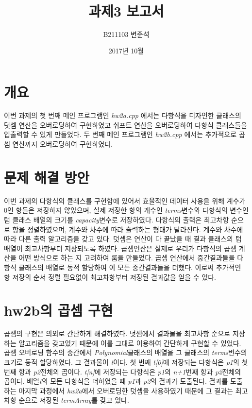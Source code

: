 \documentclass[a4paper,12pt]{article}
\begin{document}
 

\title{과제3 보고서}
\author{B211103 변준석}
\date{2017년 10월}
\maketitle

\newpage
\section{개요}
이번 과제의 첫 번째 메인 프로그램인 \textsl{hw2a.cpp} 에서는 다항식을 디자인한 클래스의 덧셈 연산을 오버로딩하여 구현하였고 쉬프트 연산을 오버로딩하여 다항식 클래스들을 입출력할 수 있게 만들었다.
두 번째 메인 프로그램인 \textsl{hw2b.cpp} 에서는 추가적으로 곱셈 연산까지 오버로딩하여 구현하였다.

\section{문제 해결 방안}
이번 과제의 다항식의 클래스를 구현함에 있어서 효율적인 데이터 사용을 위해 계수가 0인 항들은 저장하지 않았으며, 실제 저장한 항의 개수인 \textsl{terms}변수와 다항식의 변수인 텀 클래스 배열의 크기를 \textsl{capacity}변수로 저장하였다.
다항식의 출력은 최고차항 순으로 항을 정렬하였으며, 계수와 차수에 따라 출력하는 형태가 달라진다. 계수와 차수에 따라 다른 출력 알고리즘을 갖고 있다. 덧셈은 연산이 다 끝났을 때 결과 클래스의 텀 배열이 최고차항부터 저장되도록 하였다.
곱셈연산은 실제로 우리가 다항식의 곱셈 계산을 어떤 방식으로 하는 지 고려하여 룹을 만들었다. 곱셈 연산에서 중간결과들을 다항식 클래스의 배열로 동적 할당하여 이 모든 중간결과들을 더했다. 이로써 추가적인 항 저장의 순서 정렬 필요없이 최고차항부터 저장된 결과값을 얻을 수 있다.


\section{hw2b의 곱셈 구현}
곱셈의 구현은 의외로 간단하게 해결하였다. 덧셈에서 결과물을 최고차항 순으로 저장하는 알고리즘을 갖고있기 때문에 이를 그대로 이용하여 간단하게 구현할 수 있었다.
곱셈 오버로딩 함수의 중간에서 \textsl{Polynomial}클래스의 배열을 그 클래스의 \textsl{terms}변수의 크기로 동적 할당하였다. 그 결과물이 \textsl{t}이다.
첫 번째 \textsl{t[0]}에 저장되는 다항식은 \textsl{p1}의 첫 번째 항과 \textsl{p2}전체의 곱이다. \textsl{t[n]}에 저장되는 다항식은 \textsl{p1}의 \textsl{n+1}번째 항과 \textsl{p2}전체의 곱이다.
배열\textsl{t}의 모든 다항식을 더하였을 때 \textsl{p1}과 \textsl{p2}의 결과가 도출된다. 결과를 도출하는 마지막 과정에서 \textsl{hw2a}에서 오버로딩한 덧셈을 사용하였기 때문에 그 결과는 최고차항 순으로 저장된 \textsl{termArray}를 갖고 있다.
\end{document}
